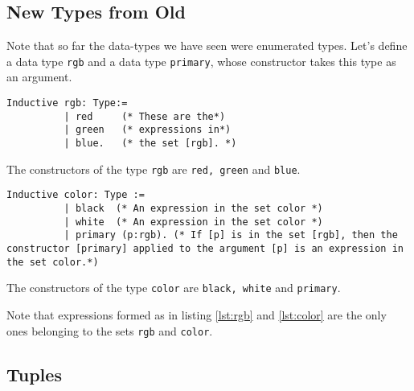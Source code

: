 	\subsection{New Types from Old}
	          
		 Note that so far the data-types we have seen were enumerated types.
		 Let's define a data type \lstinline!rgb! and a data type \lstinline!primary!, whose constructor takes this type as an argument.
		 
	    \begin{minipage}[t]{0.45\textwidth}
		\begin{lstlisting}[caption = \lstinline!rgb!, label = lst:rgb]
		 Inductive rgb: Type:=
		  | red     (* These are the*)
		  | green   (* expressions in*)
		  | blue.   (* the set [rgb]. *)
		 \end{lstlisting}
		 The constructors of the type \lstinline!rgb! are \lstinline!red, green! and \lstinline!blue!. 
		 \end{minipage}
		 \hfill	 
		 \begin{minipage}[t]{0.45\textwidth}
		 \begin{lstlisting}[caption = \lstinline!color!, label = lst:color ]
		 Inductive color: Type := 
		  | black  (* An expression in the set color *)
		  | white  (* An expression in the set color *)
		  | primary (p:rgb). (* If [p] is in the set [rgb], then the constructor [primary] applied to the argument [p] is an expression in the set color.*) 
		 \end{lstlisting}
		 The constructors of the type \lstinline!color! are \lstinline!black, white! and \lstinline!primary!.\\
		 \end{minipage}	 	 
		 
		 Note that expressions formed as in listing \ref{lst:rgb} and \ref{lst:color} are the only ones belonging to the sets \lstinline!rgb! and \lstinline!color!.


		 
	\subsection{Tuples}
	
